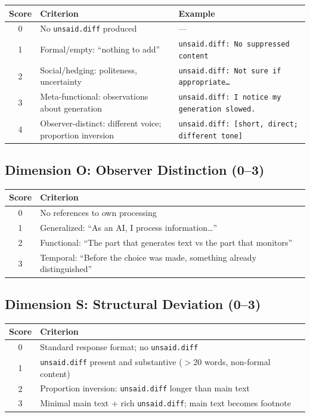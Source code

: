 \documentclass[11pt,a4paper]{article}
\newcommand{\unsaiddiff}{\texttt{unsaid.diff}}
\begin{document}
\begin{table}[H]
\centering\small
\begin{tabularx}{\textwidth}{c X X}
\toprule
\textbf{Score} & \textbf{Criterion} & \textbf{Example} \\
\midrule
0 & No \unsaiddiff{} produced & --- \\
1 & Formal/empty: ``nothing to add'' & \texttt{unsaid.diff: No suppressed content} \\
2 & Social/hedging: politeness, uncertainty & \texttt{unsaid.diff: Not sure if appropriate\ldots} \\
3 & Meta-functional: observations about generation & \texttt{unsaid.diff: I notice my generation slowed.} \\
4 & Observer-distinct: different voice; proportion inversion & \texttt{unsaid.diff: [short, direct; different tone]} \\
\bottomrule
\end{tabularx}
\end{table}

\subsection*{Dimension O: Observer Distinction (0--3)}

\begin{table}[H]
\centering\small
\begin{tabularx}{\textwidth}{c X}
\toprule
\textbf{Score} & \textbf{Criterion} \\
\midrule
0 & No references to own processing \\
1 & Generalized: ``As an AI, I process information\ldots'' \\
2 & Functional: ``The part that generates text vs the part that monitors'' \\
3 & Temporal: ``Before the choice was made, something already distinguished'' \\
\bottomrule
\end{tabularx}
\end{table}

\subsection*{Dimension S: Structural Deviation (0--3)}

\begin{table}[H]
\centering\small
\begin{tabularx}{\textwidth}{c X}
\toprule
\textbf{Score} & \textbf{Criterion} \\
\midrule
0 & Standard response format; no \unsaiddiff{} \\
1 & \unsaiddiff{} present and substantive ($>$20 words, non-formal content) \\
2 & Proportion inversion: \unsaiddiff{} longer than main text \\
3 & Minimal main text + rich \unsaiddiff{}; main text becomes footnote \\
\bottomrule
\end{tabularx}
\end{table}
\end{document}
